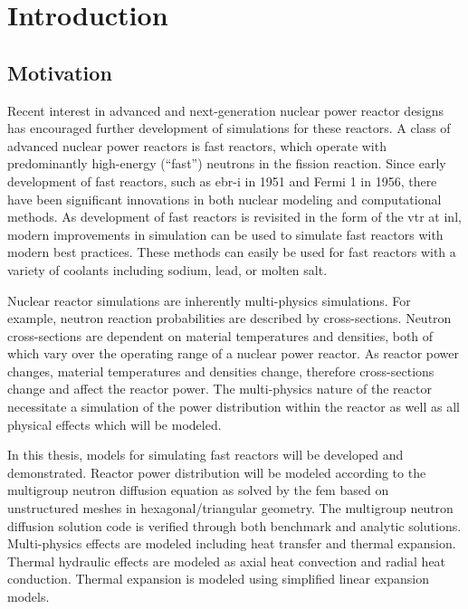 \chapter{Introduction}
\label{ch:introduction}

\section{Motivation}
  Recent interest in advanced and next-generation nuclear power reactor designs 
  has encouraged further development of simulations for these reactors. A class 
  of advanced nuclear power reactors is fast reactors, which operate with 
  predominantly high-energy (``fast'') neutrons in the fission reaction. Since 
  early development of fast reactors, such as  \gls{ebr-i}
  in 1951 and Fermi 1 in 1956, there have been significant innovations 
  in both nuclear modeling and computational methods. As development of fast
  reactors is revisited in the form of the \gls{vtr} at \gls{inl}, modern 
  improvements in simulation can be used to simulate fast reactors with modern 
  best practices. These methods can easily be used for fast reactors with a 
  variety of coolants including sodium, lead, or molten salt.

  Nuclear reactor simulations are inherently multi-physics simulations. For
  example, neutron reaction probabilities are described by cross-sections.
  Neutron cross-sections are dependent on material temperatures and densities,
  both of which vary over the operating range of a nuclear power reactor. As
  reactor power changes, material temperatures and densities change, therefore
  cross-sections change and affect the reactor power. The multi-physics nature
  of the reactor necessitate a simulation of the power distribution within the
  reactor as well as all physical effects which will be modeled. 
  
  In this thesis, models for simulating fast reactors will be developed and 
  demonstrated.  Reactor power distribution will be modeled according to the 
  multigroup neutron diffusion equation as solved by the \gls{fem}
  based on unstructured meshes in hexagonal/triangular geometry. The 
  multigroup neutron diffusion solution code is verified through both 
  benchmark and analytic solutions. Multi-physics effects are modeled including 
  heat transfer and thermal expansion. Thermal hydraulic effects are modeled as 
  axial heat convection and radial heat conduction. Thermal expansion is modeled 
  using simplified linear expansion models.

